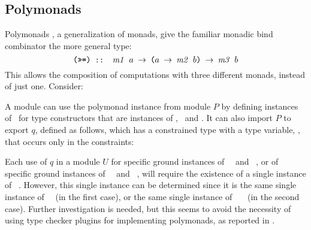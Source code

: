 \subsection{Polymonads}
\label{sec:polymonads}

Polymonads \cite{Polymonadic-programming14,Polymonads-in-Haskell2015},
a generalization of monads, give the familiar monadic bind combinator
the more general type:
\[ \texttt{(>>=) :: {\it m1\/}\ $a$ $\rightarrow$ ($a$ $\rightarrow$ {\it m2\/}\ $b$)
  $\rightarrow$ {\it m3\/}\ $b$}
\]
This allows the composition of computations with three different
monads, instead of just one. Consider:


A module can use the polymonad instance from module $P$ by defining
instances of \Morph\ for type constructors that are instances of \mUm,
\mDois\ and \mTres. It can also import $P$ to export $q$, defined as
follows, which has a constrained type with a type variable, \mTres, that
occurs only in the constraints:


Each use of $q$ in a module $U$ for specific ground instances of
\Monad\ \mUm\ and \Monad\ \mDois, or of specific ground instances of
\Monad\ \mQuatro\ and \Monad\ \mCinco, will require the existence of a
single instance of \Monad\ \mTres. However, this single instance can
be determined since it is the same single instance of
\Morph\ \mDois\ \mTres (in the first case), or the same single
instance of \Morph\ \mTres\ \mQuatro\ (in the second case). Further
investigation is needed, but this seems to avoid the necessity of
using type checker plugins for implementing polymonads, as reported in
\cite{Polymonads-in-Haskell2015}.

